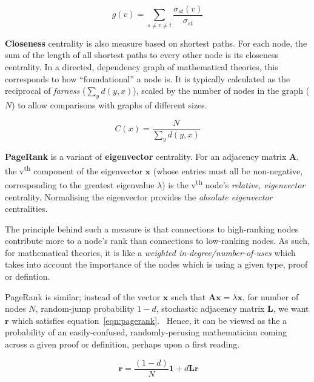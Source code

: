 \begin{equation}
  g\left(v\right) = \sum_{s \neq v \neq t} \frac{\sigma_{st}\left(v\right)}{\sigma_{st}}
\end{equation}

\textbf{Closeness} centrality is also measure based on shortest paths. For each
node, the sum of the length of all shortest paths to every other node is its
closeness centrality. In a directed, dependency graph of mathematical theories,
this corresponds to how ``foundational'' a node is. It is typically calculated
as the reciprocal of \emph{farness} ($\sum_{y}d\left(y,x\right)$), scaled by
the number of nodes in the graph ($N$) to allow comparisons with graphs of
different sizes.~\cite{bavelas1950}

\begin{equation}
  C\left(x\right) = \frac{N}{\sum_{y}d\left(y,x\right)}
\end{equation}

\textbf{PageRank} is a variant of \textbf{eigenvector} centrality.  For an
adjacency matrix $\mathbf{A}$, the v\textsuperscript{th} component of the
eigenvector $\mathbf{x}$ (whose entries must all be non-negative, corresponding
to the greatest eigenvalue $\lambda$) is the v\textsuperscript{th} node's
\emph{relative, eigenvector} centrality. Normalising the eigenvector provides
the \emph{absolute eigenvector} centralities.~\cite{newman2008}

The principle behind such a measure is that connections to high-ranking nodes
contribute more to a node's rank than connections to low-ranking nodes.  As
such, for mathematical theories, it is like a \emph{weighted
in-degree/number-of-uses} which takes into account the importance of the nodes
which is using a given type, proof or defintion.

PageRank is similar; instead of the vector $\mathbf{x}$ such that $\mathbf{Ax}
= \lambda\mathbf{x}$, for number of nodes $N$, random-jump probability $1-d$,
stochastic adjacency matrix $\mathbf{L}$, we want $\mathbf{r}$ which satisfies
equation~\ref{eqn:pagerank}.~\cite{page1999} Hence, it can be viewed as the a
probability of an easily-confused, randomly-perusing mathematician coming
across a given proof or definition, perhaps upon a first reading.

\begin{equation}~\label{eqn:pagerank}
  \mathbf{r} = \frac{\left(1-d\right)}{N} \mathbf{1} + d\mathbf{Lr}
\end{equation}

